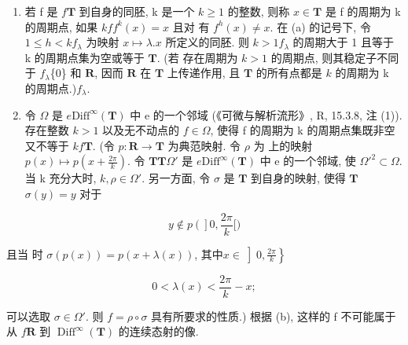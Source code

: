 \begin{enumerate}
\def\labelenumi{(\alph{enumi})}
\setcounter{enumi}{1}
\item
  若 f 是 \(f\)\(\mathbf{T}\) 到自身的同胚, k 是一个 \(k\)\(\geqslant 1\) 的整数, 则称 \(x \in \mathbf{T}\) 是 f 的周期为 k 的周期点, 如果 \(k\)\(f\)\(f^k(x) = x\) 且对  有 \(f^h(x) \neq x\). 在 (a) 的记号下, 令 \(1 \leqslant h < k\)\(f_{\lambda}\) 为映射 \(x \mapsto \lambda .x\) 所定义的同胚. 则 \(k > 1\)\(f_{\lambda}\) 的周期大于 1 且等于 k 的周期点集为空或等于 \(\mathbf{T}\). (若  存在周期为 \(k > 1\) 的周期点, 则其稳定子不同于 \(f_{\lambda}\)\{0\} 和 \(\mathbf{R}\), 因而 \(\mathbf{R}\) 在 \(\mathbf{T}\) 上传递作用, 且 \(\mathbf{T}\) 的所有点都是 \(k\) 的周期为 k 的周期点.)\(f_{\lambda}.\)
\item
  令 \(\Omega\) 是 \(e\)\(\mathrm{Diff}^{\infty}(\mathbf{T})\) 中 e 的一个邻域 (《可微与解析流形》, R, 15.3.8, 注 (1)). 存在整数 \(k > 1\) 以及无不动点的 \(f\in \Omega\), 使得 f 的周期为 k 的周期点集既非空又不等于 \(k\)\(f\)\(\mathbf{T}\). (令 \(p\colon \mathbf{R}\to \mathbf{T}\) 为典范映射. 令 \(\rho\) 为  上的映射 \(p(x) \mapsto p\left(x + \frac{2\pi}{k}\right)\). 令 \(\mathbf{T}\)\(\mathbf{T}\)\(\Omega'\) 是 \(e\)\(\text{Diff}^\infty(\mathbf{T})\) 中 e 的一个邻域, 使 \(\Omega'^2 \subset \Omega\). 当 k 充分大时, \(k, \rho \in \Omega'\). 另一方面, 令 \(\sigma\) 是 \(\mathbf{T}\) 到自身的映射, 使得 \(\mathbf{T}\)\(\sigma(y) = y\) 对于
\end{enumerate}

\[
y \notin p \left(\right] 0, \frac {2 \pi}{k} [)
\]

且当  时 \(\sigma(p(x)) = p(x + \lambda(x))\), 其中\(x \in \left]0, \frac{2\pi}{k}\right\}\)

\[
0 <   \lambda (x) <   \frac {2 \pi}{k} - x;
\]

可以选取 \(\sigma \in \Omega'\). 则 \(f = \rho \circ \sigma\) 具有所要求的性质.) 根据 (b), 这样的 f 不可能属于从 \(f\)\(\mathbf{R}\) 到 \(\operatorname{Diff}^{\infty}(\mathbf{T})\) 的连续态射的像.

